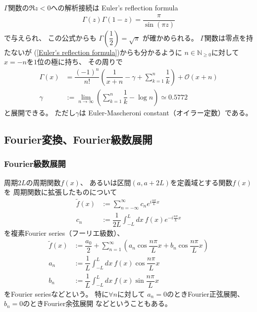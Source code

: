 $\Gamma$関数の$\Re z < 0$への解析接続は
Euler's reflection formula
\begin{align}
    \Gamma(z) \Gamma(1-z)
    =
    \dfrac{\pi}{\sin(\pi z)}
\label{Euler's reflection formula}
\end{align}
で与えられ、
この公式からも
$\Gamma \left(\dfrac{1}{2}\right) = \sqrt{\pi}$
が確かめられる。
$\Gamma$関数は零点を持たないが
(\ref{Euler's reflection formula})からも分かるように
$n \in \mathbb{N}_{\ge0}$に対して
$x = - n$を$1$位の極に持ち、
その周りで
\begin{align}
    \Gamma(x)
    &=
    \dfrac{(-1)^n}{n!}
    \left(
        \dfrac{1}{x+n} - \gamma
        + \sum_{k=1}^n \dfrac{1}{k}
    \right)
    + \mathcal{O}(x+n)
\\
    \gamma
    &:=
    \lim_{n\to\infty}
    \left(
        \sum_{k=1}^n \dfrac{1}{k} 
        -
        \log n
    \right)
    \simeq 0.5772
\end{align}
と展開できる。
ただし$\gamma$は
Euler-Mascheroni constant（オイラー定数）である。


\subsection{Fourier変換、Fourier級数展開}

\subsubsection{Fourier級数展開}

周期$2L$の周期関数$f(x)$、
あるいは区間$(a, a + 2L)$を定義域とする関数$f(x)$を
周期関数に拡張したものについて
\begin{subequations}
\begin{align}
    \tilde{f}(x)
    &:=
    \sum_{n=-\infty}^\infty
    c_n e^{ i\frac{n \pi}{L}x }
\\
    c_n
    &:=
    \dfrac{1}{2L} \int_{-L}^L dx\ 
    f(x) e^{ - i\frac{n \pi}{L}x }
\end{align}
\end{subequations}
を複素Fourier series（フーリエ級数）、
\begin{subequations}
\begin{align}
    \tilde{f}(x)
    &:=
    \dfrac{a_0}{2}
    +
    \sum_{n=1}^\infty
    \left(
        a_n \cos \dfrac{n \pi}{L}x
        +
        b_n \cos \dfrac{n \pi}{L}x
    \right)
\\
    a_n
    &:=
    \dfrac{1}{L} \int_{-L}^L dx\ 
    f(x) \cos\dfrac{n \pi}{L}x
\\
    b_n
    &:=
    \dfrac{1}{L} \int_{-L}^L dx\ 
    f(x) \sin\dfrac{n \pi}{L}x
\end{align}
\end{subequations}
をFourier seriesなどという。
特に$\forall n$に対して
$a_n = 0$のときFourier正弦展開、
$b_n = 0$のときFourier余弦展開
などということもある。

